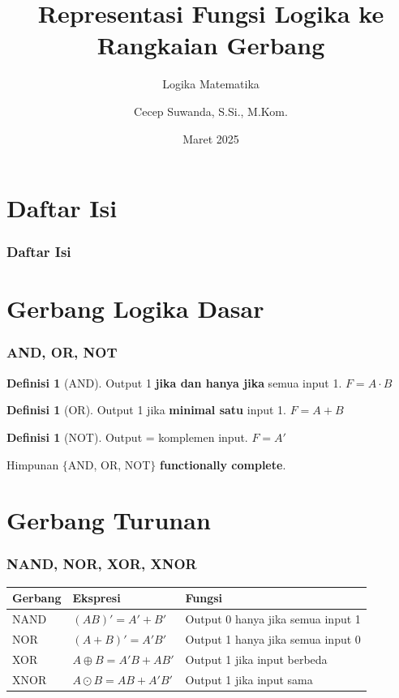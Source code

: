 \documentclass[handout]{beamer}
\subtitle[Logika Matematika]{Logika Matematika}
\title[Rangkaian Gerbang]{Representasi Fungsi Logika ke Rangkaian Gerbang}
\author{Cecep Suwanda, S.Si., M.Kom.}
\date{Maret 2025}
\institute{Universitas Bale Bandung}
\theoremstyle{definition}
\newtheorem{definisi}[theorem]{Definisi}
\theoremstyle{example}
\begin{document}
\maketitle

\section*{Daftar Isi}
\begin{frame}
\frametitle{Daftar Isi}
\tableofcontents
\end{frame}

\section{Gerbang Logika Dasar}

\begin{frame}
\frametitle{AND, OR, NOT}
\begin{definisi}[AND]
Output 1 \textbf{jika dan hanya jika} semua input 1. $F = A \cdot B$
\end{definisi}
\begin{definisi}[OR]
Output 1 jika \textbf{minimal satu} input 1. $F = A + B$
\end{definisi}
\begin{definisi}[NOT]
Output = komplemen input. $F = A'$
\end{definisi}
Himpunan $\{$AND, OR, NOT$\}$ \textbf{functionally complete}.
\end{frame}

\section{Gerbang Turunan}

\begin{frame}
\frametitle{NAND, NOR, XOR, XNOR}
\begin{center}
\small
\begin{tabular}{|l|l|l|}
\hline
\textbf{Gerbang} & \textbf{Ekspresi} & \textbf{Fungsi} \\ \hline
NAND & $(AB)' = A'+B'$ & Output 0 hanya jika semua input 1 \\ \hline
NOR & $(A+B)' = A'B'$ & Output 1 hanya jika semua input 0 \\ \hline
XOR & $A \oplus B = A'B+AB'$ & Output 1 jika input berbeda \\ \hline
XNOR & $A \odot B = AB+A'B'$ & Output 1 jika input sama \\ \hline
\end{tabular}
\end{center}
\end{frame}
\end{document}
